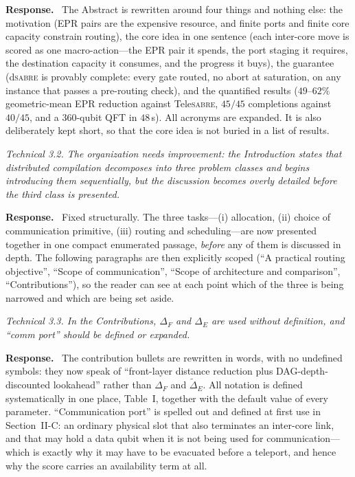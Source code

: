 \documentclass[11pt]{article}
\newcommand{\dSABRE}{d\textsc{sabre}}
\newcommand{\TeleSABRE}{Tele\textsc{sabre}}
\newenvironment{comment}{\medskip\noindent\itshape}{\par}
\newcommand{\response}{\smallskip\noindent\textbf{Response.}\ }
\begin{document}
\response
The Abstract is rewritten around four things and nothing else: the motivation
(EPR pairs are the expensive resource, and finite ports and finite core
capacity constrain routing), the core idea in one sentence (each inter-core
move is scored as one macro-action---the EPR pair it spends, the port staging
it requires, the destination capacity it consumes, and the progress it buys),
the guarantee (\dSABRE{} is provably complete: every gate routed, no abort at
saturation, on any instance that passes a pre-routing check), and the
quantified results ($49$--$62\%$ geometric-mean EPR
reduction against \TeleSABRE{}, $45/45$ completions against $40/45$, and a
360-qubit QFT in $48$\,s). All acronyms are expanded. It is also deliberately
kept short, so that the core idea is not buried in a list of results.

\begin{comment}
Technical 3.2. The organization needs improvement: the Introduction states
that distributed compilation decomposes into three problem classes and begins
introducing them sequentially, but the discussion becomes overly detailed
before the third class is presented.
\end{comment}

\response
Fixed structurally. The three tasks---(i) allocation, (ii) choice of
communication primitive, (iii) routing and scheduling---are now presented
together in one compact enumerated passage, \emph{before} any of them is
discussed in depth. The following paragraphs are then explicitly scoped
(``A practical routing objective'', ``Scope of communication'', ``Scope of
architecture and comparison'', ``Contributions''), so the reader can see at
each point which of the three is being narrowed and which are being set aside.

\begin{comment}
Technical 3.3. In the Contributions, $\Delta_F$ and $\Delta_E$ are used
without definition, and ``comm port'' should be defined or expanded.
\end{comment}

\response
The contribution bullets are rewritten in words, with no undefined symbols:
they now speak of ``front-layer distance reduction plus DAG-depth-discounted
lookahead'' rather than $\Delta_F$ and $\widetilde{\Delta}_E$. All notation is
defined systematically in one place, Table~I, together with the default value
of every parameter. ``Communication port'' is spelled out and defined at first
use in Section~II-C: an ordinary physical slot that also terminates an
inter-core link, and that may hold a data qubit when it is not being used for
communication---which is exactly why it may have to be evacuated before a
teleport, and hence why the score carries an availability term at all.
\end{document}
